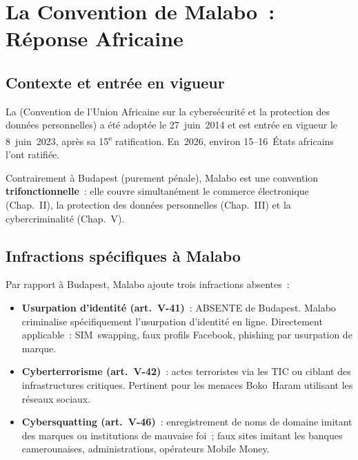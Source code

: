 \section{La Convention de Malabo~: Réponse Africaine}
\label{sec:malabo}

\subsection{Contexte et entrée en vigueur}

La  (Convention
de l'Union Africaine sur la cybersécurité et la protection des données
personnelles) a été adoptée le 27~juin~2014 et est entrée en vigueur
le 8~juin~2023, après sa 15\textsuperscript{e} ratification.
En~2026, environ 15--16~États africains l'ont ratifiée.

Contrairement à Budapest (purement pénale), Malabo est une convention
\textbf{trifonctionnelle}~: elle couvre simultanément le commerce
électronique (Chap.~II), la protection des données personnelles
(Chap.~III) et la cybercriminalité (Chap.~V).

\subsection{Infractions spécifiques à Malabo}

Par rapport à Budapest, Malabo ajoute trois infractions absentes~:

\begin{itemize}
    \item \textbf{Usurpation d'identité (art.~V-41)}~: ABSENTE de Budapest.
          Malabo criminalise spécifiquement l'usurpation d'identité en
          ligne. Directement applicable~: SIM~swapping, faux profils
          Facebook, phishing par usurpation de marque.
    \item \textbf{Cyberterrorisme (art.~V-42)}~: actes terroristes via
          les TIC ou ciblant des infrastructures critiques. Pertinent
          pour les menaces Boko~Haram utilisant les réseaux sociaux.
    \item \textbf{Cybersquatting (art.~V-46)}~: enregistrement de noms
          de domaine imitant des marques ou institutions de mauvaise foi~;
          faux sites imitant les banques camerounaises, administrations,
          opérateurs Mobile Money.
\end{itemize}


